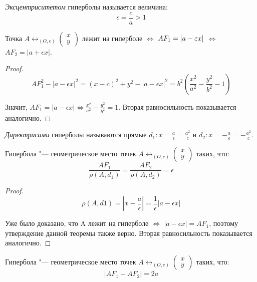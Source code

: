 \begin{definition}
	\textit{Эксцентриситетом} гиперболы называется величина:
	\[\epsilon = \frac{c}{a} > 1\]
\end{definition}

\begin{theorem}
	Точка $A \leftrightarrow_{(O, e)}\begin{pmatrix}x\\y\end{pmatrix}$ лежит на гиперболе $\Leftrightarrow$ $AF_1 \hm{=} |a - \epsilon  x|$ $\Leftrightarrow$ $AF_2 = |a + \epsilon x|$.
\end{theorem}

\begin{proof}
	\[AF_1^2 - |a - \epsilon x|^2 = (x - c)^2 + y^2 - |a - \epsilon x|^2 = b^2\left(\frac{x^2}{a^2}-\frac{y^2}{b^2} - 1\right)\]
	
	Значит, $AF_1 = |a - \epsilon x| \Leftrightarrow \frac{x^2}{a^2}-\frac{y^2}{b^2} = 1$. Вторая равносильность показывается аналогично.
\end{proof}

\begin{definition}
	\textit{Директрисами} гиперболы называются прямые $d_1: x = \frac{a}{\epsilon} = \frac{a^2}{c}$ и $d_2: x = -\frac{a}{\epsilon} = -\frac{a^2}{c}$.
\end{definition}

\begin{theorem}
	Гипербола "--- геометрическое место точек $A \leftrightarrow_{(O, e)} \begin{pmatrix}x\\y\end{pmatrix}$ таких, что:
	\[\frac{AF_1}{\rho(A, d_1)} = \frac{AF_2}{\rho(A, d_2)} = \epsilon\]
\end{theorem}

\begin{proof}
	\[\rho(A, d1) = |x - \frac{a}{\epsilon}| = \frac{1}{\epsilon}|a - \epsilon x|\]
	
	Уже было доказано, что A лежит на гиперболе $\Leftrightarrow$ $|a - \epsilon x| = AF_1$, поэтому утверждение данной теоремы также верно. Вторая равносильность показывается аналогично.
\end{proof}

\begin{theorem}
	Гипербола "--- геометрическое место точек $A \leftrightarrow_{(O, e)} \begin{pmatrix}x\\y\end{pmatrix}$ таких, что:
	\[|AF_1 - AF_2| = 2a\]
\end{theorem}

